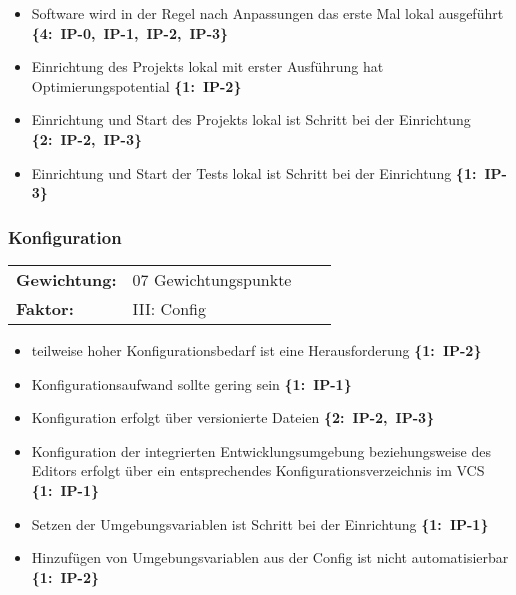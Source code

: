 \begin{flushleft}
    \begin{itemize}
        \item Software wird in der Regel nach Anpassungen \linebreak[4] das erste Mal lokal ausgeführt \mbox{\textbf{\{4: IP-0, IP-1, IP-2, IP-3\}}}
        \item Einrichtung des Projekts lokal mit \linebreak[4] erster Ausführung hat Optimierungspotential \mbox{\textbf{\{1: IP-2\}}}
        \item Einrichtung und Start des Projekts lokal ist Schritt bei der Einrichtung \mbox{\textbf{\{2: IP-2, IP-3\}}}
        \item Einrichtung und Start der Tests lokal ist Schritt bei der Einrichtung \mbox{\textbf{\{1: IP-3\}}}
    \end{itemize}
\end{flushleft}

\subsubsection{Konfiguration}
\label{subsubsec:AA-04-01-03_req-dev-configuration}

\vspace{0.5em}
\begin{tabular}{ll@{}ll@{}}
    \textbf{Gewichtung:}    &   07 Gewichtungspunkte    \\
    \textbf{Faktor:}        &   III: Config             \\
\end{tabular}

\begin{flushleft}
    \begin{itemize}
        \item teilweise hoher Konfigurationsbedarf ist eine Herausforderung \mbox{\textbf{\{1: IP-2\}}}
        \item Konfigurationsaufwand sollte gering sein \mbox{\textbf{\{1: IP-1\}}}
        \item Konfiguration erfolgt über versionierte Dateien \mbox{\textbf{\{2: IP-2, IP-3\}}}
        \item Konfiguration der integrierten Entwicklungsumgebung beziehungsweise des Editors \linebreak[1] erfolgt über ein entsprechendes Konfigurationsverzeichnis im VCS \mbox{\textbf{\{1: IP-1\}}}
        \item Setzen der Umgebungsvariablen ist Schritt bei der Einrichtung \mbox{\textbf{\{1: IP-1\}}}
        \item Hinzufügen von Umgebungsvariablen aus der Config ist nicht automatisierbar \mbox{\textbf{\{1: IP-2\}}}
    \end{itemize}
\end{flushleft}

